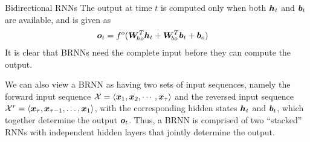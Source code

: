 \begin{frame}{Bidirectional RNNs}
The output at time $t$ is computed only when both ${\boldsymbol h}_t$ and ${\boldsymbol b}_t$
are available, and is given as
\begin{align*}
    {\boldsymbol o}_t & = f^o({\boldsymbol W}_{\!ho}^T {\boldsymbol h}_t + 
    {\boldsymbol W}_{\!bo}^T {\boldsymbol b}_{t} + {\boldsymbol b}_{o})
\end{align*}
It is clear that BRNNs need the complete input before they can compute
the output. 

\medskip

We can also view a BRNN as having two sets of input sequences, namely
the forward input sequence ${\mathcal X} = \langle {\boldsymbol x}_1, {\boldsymbol x}_2, \cdots, {\boldsymbol x}_\tau \rangle$ and the
reversed input sequence ${\mathcal X}^r = \langle {\boldsymbol x}_\tau, {\boldsymbol x}_{\tau-1}, \ldots,
{\boldsymbol x}_1 \rangle$, with the corresponding hidden states ${\boldsymbol h}_t$ and ${\boldsymbol b}_t$, which
together determine the output ${\boldsymbol o}_t$. Thus, a BRNN is comprised of two
``stacked'' RNNs with independent hidden layers 
that jointly determine the output. 
\end{frame}
%
